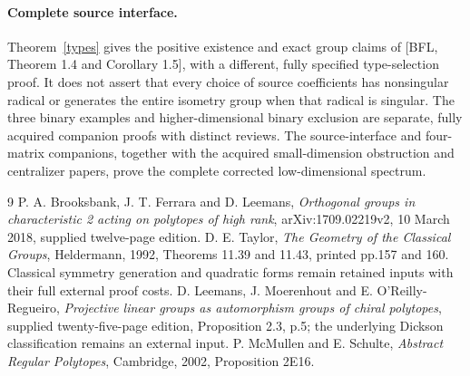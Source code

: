 \documentclass[11pt,a4paper]{article}
\begin{document}
\paragraph{Complete source interface.}
Theorem~\ref{types} gives the positive existence and exact group
claims of [BFL, Theorem 1.4 and Corollary 1.5], with a different,
fully specified type-selection proof. It does not assert that every
choice of source coefficients has nonsingular radical or generates
the entire isometry group when that radical is singular.
The three binary examples and higher-dimensional binary exclusion
are separate, fully acquired companion proofs with distinct reviews.
The source-interface and four-matrix companions, together with the
acquired small-dimension obstruction and centralizer papers, prove
the complete corrected low-dimensional spectrum.

\begin{thebibliography}{9}
 P. A. Brooksbank, J. T. Ferrara and D. Leemans,
\emph{Orthogonal groups in characteristic 2 acting on polytopes
of high rank}, arXiv:1709.02219v2, 10 March 2018,
supplied twelve-page edition.
 D. E. Taylor, \emph{The Geometry of the Classical Groups},
Heldermann, 1992, Theorems 11.39 and 11.43, printed pp.157 and 160.
Classical symmetry generation and quadratic forms remain retained inputs
with their full external proof costs.
 D. Leemans, J. Moerenhout and E. O'Reilly-Regueiro,
\emph{Projective linear groups as automorphism groups of chiral
polytopes}, supplied twenty-five-page edition, Proposition 2.3, p.5;
the underlying Dickson classification remains an external input.
 P. McMullen and E. Schulte, \emph{Abstract Regular
Polytopes}, Cambridge, 2002, Proposition 2E16.
\end{thebibliography}
\end{document}
